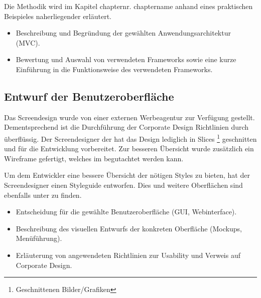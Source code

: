 Die Methodik wird im Kapitel \xx chapternr. chaptername anhand eines
praktischen Beispieles naherliegender erläutert.


\begin{itemize}
	\item Beschreibung und Begründung der gewählten Anwendungsarchitektur (\zB \acs{MVC}).
	\item \Ggfs Bewertung und Auswahl von verwendeten Frameworks sowie \ggfs eine kurze Einführung in die Funktionsweise des verwendeten Frameworks.
\end{itemize}


\subsection{Entwurf der Benutzeroberfläche}
\label{sec:Benutzeroberflaeche} 
Das Screendesign wurde von einer externen Werbeagentur zur Verfügung gestellt.
Dementsprechend ist die Durchführung der Corporate Design Richtlinien durch \mh
überflüssig.
Der Screendesigner der \mh hat das Design lediglich in Slices \footnote{Geschnittenen Bilder/Grafiken} 
geschnitten und für die Entwicklung vorbereitet. Zur besseren Übersicht wurde
zusätzlich ein Wireframe gefertigt, welches im 
begutachtet werden kann.


Um dem Entwickler eine bessere Übersicht der nötigen Styles zu bieten, hat der
Screendesigner einen Styleguide entworfen. Dies und weitere Oberflächen sind
ebenfalls unter  zu finden.



\begin{itemize}
	\item Entscheidung für die gewählte Benutzeroberfläche (\zB GUI, Webinterface).
	\item Beschreibung des visuellen Entwurfs der konkreten Oberfläche (\zB Mockups, Menüführung).
	\item \Ggfs Erläuterung von angewendeten Richtlinien zur Usability und Verweis auf Corporate Design.
\end{itemize}



